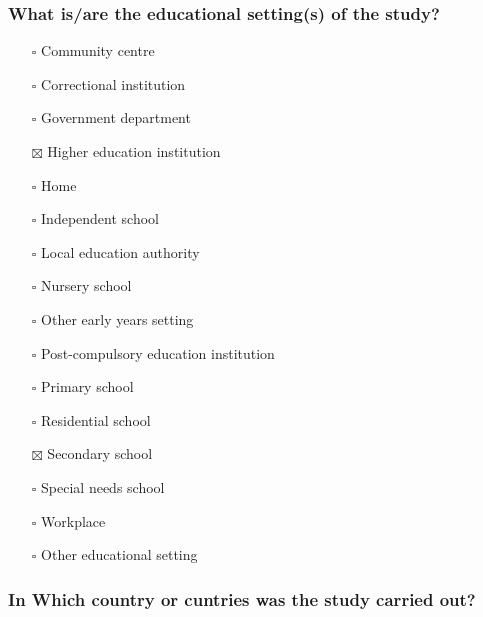 \documentclass[
  doc, a4paper]{apa7}
\providecommand{\tightlist}{%
  \setlength{\itemsep}{0pt}\setlength{\parskip}{0pt}}
\begin{document}
\subsubsection{What is/are the educational setting(s) of the study?}\label{what-isare-the-educational-settings-of-the-study}

\begin{itemize}
\tightlist
\item[$\square$]
  Community centre\\
\item[$\square$]
  Correctional institution\\
\item[$\square$]
  Government department\\
\item[$\boxtimes$]
  Higher education institution\\
\item[$\square$]
  Home\\
\item[$\square$]
  Independent school\\
\item[$\square$]
  Local education authority\\
\item[$\square$]
  Nursery school\\
\item[$\square$]
  Other early years setting\\
\item[$\square$]
  Post-compulsory education institution\\
\item[$\square$]
  Primary school\\
\item[$\square$]
  Residential school\\
\item[$\boxtimes$]
  Secondary school\\
\item[$\square$]
  Special needs school\\
\item[$\square$]
  Workplace\\
\item[$\square$]
  Other educational setting
\end{itemize}

\subsubsection{In Which country or cuntries was the study carried out?}\label{in-which-country-or-cuntries-was-the-study-carried-out}
\end{document}
